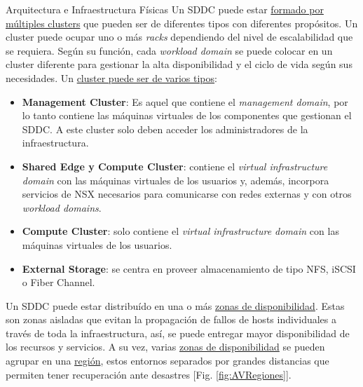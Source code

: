 \begin{subsection}{Arquitectura e Infraestructura Físicas \cite{CFfisInfraestuctura}}
\iffalse
Un SDDC puede estar \underline{formado por múltiples clusters} que pueden ser de diferentes tipos con diferentes propósitos. Un cluster puede ocupar uno o más \textit{racks} dependiendo del nivel de escalabilidad que se requiera. Según su función, cada \textit{workload domain} se puede colocar en un cluster diferente para gestionar la alta disponibilidad y el ciclo de vida según sus necesidades. Un \underline{cluster puede ser de varios tipos}:
\begin{itemize}
    \item \textbf{Management Cluster}: Es aquel que contiene el \textit{management domain}, por lo tanto contiene las máquinas virtuales de los componentes que gestionan el SDDC. A este cluster solo deben acceder los administradores de la infraestructura.
    \item \textbf{Shared Edge y Compute Cluster}: contiene el \textit{virtual infrastructure domain} con las máquinas virtuales de los usuarios y, además, incorpora servicios de NSX necesarios para comunicarse con redes externas y con otros \textit{workload domains}.
    \item \textbf{Compute Cluster}: solo contiene el \textit{virtual infrastructure domain} con las máquinas virtuales de los usuarios.
    \item \textbf{External Storage}: se centra en proveer almacenamiento de tipo NFS, iSCSI o Fiber Channel.
\end{itemize}

Un SDDC puede estar distribuído en una o más \underline{zonas de disponibilidad}. Estas son zonas aisladas que evitan la propagación de fallos de hosts individuales a través de toda la infraestructura, así, se puede entregar mayor disponibilidad de los recursos y servicios. A su vez, varias \underline{zonas de disponibilidad} se pueden agrupar en una \underline{región}, estos entornos separados por grandes distancias que permiten tener recuperación ante desastres [Fig. \ref{fig:AVRegiones}].\\


\end{subsection}
